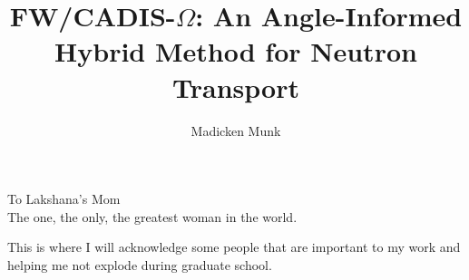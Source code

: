 \documentclass{ucbthesis}
\begin{document}

\title{FW/CADIS-$\Omega$: An Angle-Informed Hybrid Method for Neutron Transport}
\author{Madicken Munk}


\maketitle
\approvalpage
\copyrightpage



\begin{frontmatter}

\begin{dedication}
\null\vfil
\begin{center}
To Lakshana's Mom\\\vspace{12pt}
The one, the only, the greatest woman in the world.
\end{center}
\vfil\null
\end{dedication}

\setcounter{secnumdepth}{3}
\setcounter{tocdepth}{3}

\tableofcontents
\clearpage
\listoffigures
\clearpage
\listoftables

\begin{acknowledgements}
This is where I will acknowledge some people that are important to
my work and helping me not explode during graduate school.
\end{acknowledgements}

\end{frontmatter}
\end{document}
